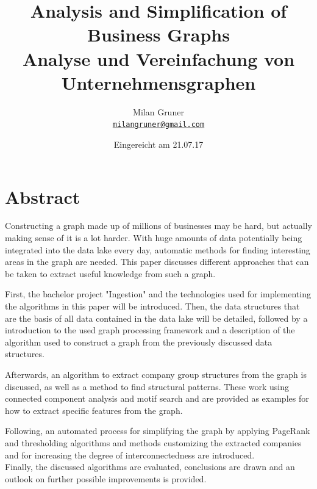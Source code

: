 \documentclass[
        a4paper,     %
        titlepage,   %
        oneside,     %
        parskip      %
]{scrartcl}          %
\title{
  Analysis and Simplification of\\Business Graphs
  \\ \bigskip
  \large{Analyse und Vereinfachung von Unternehmensgraphen}
}
\author{Milan Gruner\\\small{\href{mailto:milangruner@gmail.com}{\nolinkurl{milangruner@gmail.com}}}}
\date{Eingereicht am 21.07.17}
\begin{document}
  \maketitle %
  \clearpage %

  \section*{Abstract}
  { \large
    Constructing a graph made up of millions of businesses may be hard, but actually making sense of it is a lot harder.
    With huge amounts of data potentially being integrated into the data lake every day, automatic methods for finding interesting areas in the graph are needed.
    This paper discusses different approaches that can be taken to extract useful knowledge from such a graph.

    First, the bachelor project "Ingestion" and the technologies used
    for implementing the algorithms in this paper will be introduced.
    Then, the data structures that are the basis of all data contained in the
    data lake will be detailed, followed by a introduction to the used graph processing
    framework and a description of the algorithm used to construct a graph from the
    previously discussed data structures.

    Afterwards, an algorithm to extract company group structures from the graph
    is discussed, as well as a method to find structural patterns. These work using
    connected component analysis and motif search and are provided as examples for
    how to extract specific features from the graph.

    Following, an automated process for simplifying the graph by applying PageRank
    and thresholding algorithms and methods customizing the extracted companies
    and for increasing the degree of interconnectedness are introduced.\\
    Finally, the discussed algorithms are evaluated, conclusions are drawn
    and an outlook on further possible improvements is provided.
  }
  \clearpage
\end{document}
